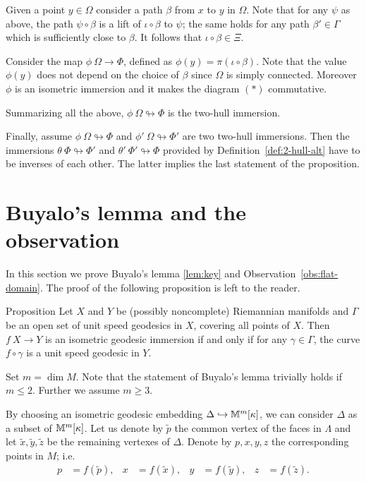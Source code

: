 \documentclass[oneside,a4paper]{article}
\begin{document}
Given a point $y\in \Omega$ consider a path $\beta$ from $x$ to $y$ in $\Omega$.
Note that for any $\psi$ as above,
the path $\psi\circ\beta$ is a lift of $\iota\circ\beta$ to $\psi$;
the same holds for any path $\beta'\in\Gamma$ 
which is sufficiently close to $\beta$.
It follows that $\iota\circ\beta\in\Xi$.

Consider the map $\phi\:\Omega\to \Phi$, defined as $\phi(y)= \pi(\iota\circ\beta)$.
Note that the value $\phi(y)$ does not depend on the choice of $\beta$ since $\Omega$ is simply connected.
Moreover $\phi$ is an isometric immersion and
it makes the diagram $({*})$ commutative.

Summarizing all the above, $\phi\:\Omega\looparrowright\Phi$ is the two-hull immersion.

Finally, assume $\phi\:\Omega\looparrowright\Phi$ and $\phi'\:\Omega\looparrowright\Phi'$
are two two-hull immersions.
Then the immersions  $\theta\:\Phi\looparrowright\Phi'$ and $\theta'\:\Phi'\looparrowright\Phi$
provided by Definition~\ref{def:2-hull-alt} 
have to be inverses of each other.
The latter implies the last statement of the proposition.
\qeds


\section{Buyalo's lemma and the observation}\label{sec:key-lenmma}

In this section we prove Buyalo's lemma \ref{lem:key}
and Observation~\ref{obs:flat-domain}.
The proof of the following proposition is left to the reader.

\begin{thm}{Proposition}\label{lem:triv}
Let $X$ and $Y$ be (possibly noncomplete) Riemannian manifolds
and $\Gamma$ be an open set of unit speed geodesics in $X$,
covering all points of $X$.
Then $f\:X\to Y$ is an isometric geodesic immersion
if and only if for any $\gamma\in\Gamma$,
the curve $f\circ\gamma$ is a unit speed geodesic in $Y$.
\end{thm}


Set $m=\dim M$.
Note that the statement of Buyalo's lemma trivially holds if $m\le 2$.
Further we assume $m\ge 3$.

By choosing an isometric geodesic embedding $\Delta\hookrightarrow\mathbb{M}^m[\kappa]$,
we can consider $\Delta$ as a subset of $\mathbb{M}^m[\kappa]$.
Let us denote by $\tilde p$ the common vertex of the faces in $\Lambda$ and
let $\tilde x,\tilde y,\tilde z$ be the remaining vertexes of $\Delta$.
Denote by $p,x,y,z$ the corresponding points in $M$;
i.e.
\begin{align*}
p&=f(\tilde p),
&
x&=f(\tilde x),
&
y&=f(\tilde y),
&
z&=f(\tilde z).
\end{align*}
\end{document}
